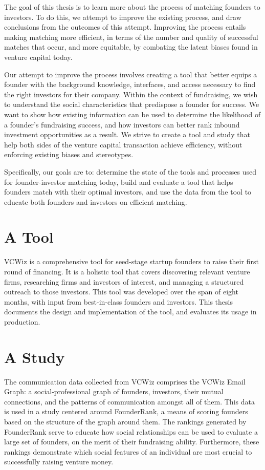 The goal of this thesis is to learn more about the process of matching founders to investors. To do this, we attempt to improve the existing process, and draw conclusions from the outcomes of this attempt. Improving the process entails making matching more efficient, in terms of the number and quality of successful matches that occur, and more equitable, by combating the latent biases found in venture capital today.

Our attempt to improve the process involves creating a tool that better equips a founder with the background knowledge, interfaces, and access necessary to find the right investors for their company. Within the context of fundraising, we wish to understand the social characteristics that predispose a founder for success. We want to show how existing information can be used to determine the likelihood of a founder's fundraising success, and how investors can better rank inbound investment opportunities as a result. We strive to create a tool and study that help both sides of the venture capital transaction achieve efficiency, without enforcing existing biases and stereotypes.

Specifically, our goals are to: determine the state of the tools and processes used for founder-investor matching today, build and evaluate a tool that helps founders match with their optimal investors, and use the data from the tool to educate both founders and investors on efficient matching.

\section{A Tool}

VCWiz is a comprehensive tool for seed-stage startup founders to raise their first round of financing. It is a holistic tool that covers discovering relevant venture firms, researching firms and investors of interest, and managing a structured outreach to those investors. This tool was developed over the span of eight months, with input from best-in-class founders and investors. This thesis documents the design and implementation of the tool, and evaluates its usage in production.

\section{A Study}

The communication data collected from VCWiz comprises the VCWiz Email Graph: a social-professional graph of founders, investors, their mutual connections, and the patterns of communication amongst all of them. This data is used in a study centered around FounderRank, a means of scoring founders based on the structure of the graph around them. The rankings generated by FounderRank serve to educate how social relationships can be used to evaluate a large set of founders, on the merit of their fundraising ability. Furthermore, these rankings demonstrate which social features of an individual are most crucial to successfully raising venture money.
